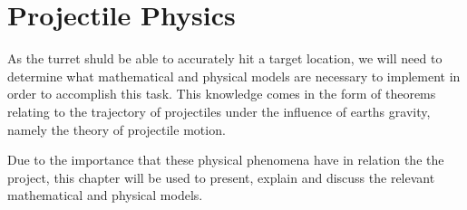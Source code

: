 \chapter{Projectile Physics}\label{ProjPhys}
As the turret shuld be able to accurately hit a target location, we will need to
determine what mathematical and physical models are necessary to implement in
order to accomplish this task. This knowledge comes in the form of theorems
relating to the trajectory of projectiles under the influence of earths
gravity, namely the theory of projectile motion.


Due to the importance that these physical phenomena have in relation the the
project, this chapter will be used to present, explain and discuss the relevant
mathematical and physical models.





